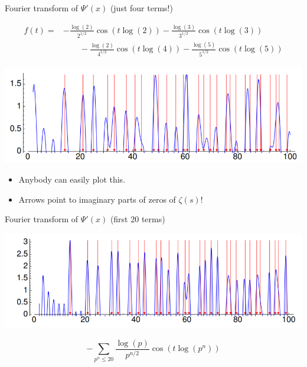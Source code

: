 \documentclass{beamer}
\begin{document}
\begin{frame}{Fourier transform of $\Psi'(x)$ (just four terms!)}

  \begin{align*}
    f(t) = & -{\frac{\log(2)}{2^{1/2}}}\cos(t\log(2))- {\frac{\log(3)}{3^{1/2}}}\cos(t\log(3))       \\
           & \qquad -{\frac{\log(2)}{4^{1/2}}}\cos(t\log(4))-{\frac{\log(5)}{5^{1/2}}}\cos(t\log(5))
  \end{align*}

  \includegraphics[height=.42\textheight]{pics/prime-power-freq-5}

  \vfill

  \begin{itemize}
    \item Anybody can easily plot this.
    \item Arrows point to imaginary parts of zeros of $\zeta(s)$!
  \end{itemize}

\end{frame}



\begin{frame}{Fourier transform of $\Psi'(x)$ (first 20 terms)}


  \includegraphics[height=.41\textheight]{pics/prime-power-freq-20}

  \vfill

  $$
  -\sum_{p^n\leq 20}{\frac{\log(p)}{p^{n/2}}}\cos(t\log(p^n))
  $$

\end{frame}
\end{document}
